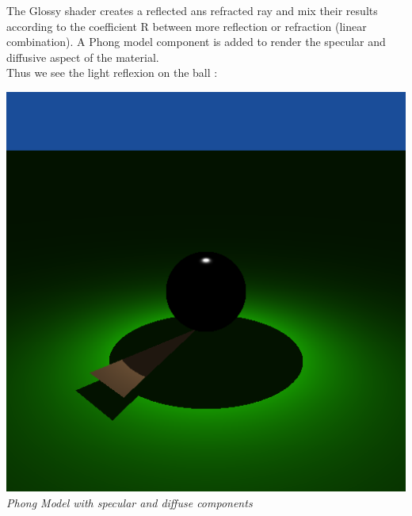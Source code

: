 \documentclass[a4,12pt]{article}
\begin{document}
	The Glossy shader creates a reflected ans refracted ray and mix their results according to the coefficient R between more reflection or refraction (linear combination). A Phong model component is added to render the specular and diffusive aspect of the material.\\
	
	Thus we see the light reflexion on the ball :
	
	\begin{center}
		\begin{minipage}[b]{0.40\linewidth}
			\begin{center}
				\includegraphics[width =\textwidth]{./Worksheet2/phong_cor.png}\\
				\textit{Phong Model with specular and diffuse components}
			\end{center}
		\end{minipage}
		\hspace{0.05\linewidth}
		\begin{minipage}[b]{0.40\linewidth}
			\begin{center}

\end{center}
\end{minipage}
\end{center}
\end{document}

